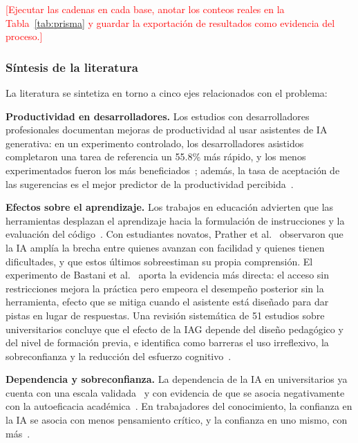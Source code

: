 \documentclass[12pt,letterpaper]{article}
\numberwithin{table}{section}
\numberwithin{figure}{section}
\newcommand{\pendiente}[1]{\textcolor{red}{[#1]}}
\begin{document}
\pendiente{Ejecutar las cadenas en cada base, anotar los conteos reales en la Tabla~\ref{tab:prisma} y guardar la exportación de resultados como evidencia del proceso.}

\subsubsection{Síntesis de la literatura}

La literatura se sintetiza en torno a cinco ejes relacionados con el problema:

\textbf{Productividad en desarrolladores.} Los estudios con desarrolladores profesionales documentan mejoras de productividad al usar asistentes de IA generativa: en un experimento controlado, los desarrolladores asistidos completaron una tarea de referencia un 55.8\% más rápido, y los menos experimentados fueron los más beneficiados~\cite{peng2023impact}; además, la tasa de aceptación de las sugerencias es el mejor predictor de la productividad percibida~\cite{ziegler2024measuring}.

\textbf{Efectos sobre el aprendizaje.} Los trabajos en educación advierten que las herramientas desplazan el aprendizaje hacia la formulación de instrucciones y la evaluación del código~\cite{becker2023programming}. Con estudiantes novatos, Prather et al.~\cite{prather2024widening} observaron que la IA amplía la brecha entre quienes avanzan con facilidad y quienes tienen dificultades, y que estos últimos sobreestiman su propia comprensión. El experimento de Bastani et al.~\cite{bastani2025generative} aporta la evidencia más directa: el acceso sin restricciones mejora la práctica pero empeora el desempeño posterior sin la herramienta, efecto que se mitiga cuando el asistente está diseñado para dar pistas en lugar de respuestas. Una revisión sistemática de 51 estudios sobre universitarios concluye que el efecto de la IAG depende del diseño pedagógico y del nivel de formación previa, e identifica como barreras el uso irreflexivo, la sobreconfianza y la reducción del esfuerzo cognitivo~\cite{martinezcarcelen2025impacto}.

\textbf{Dependencia y sobreconfianza.} La dependencia de la IA en universitarios ya cuenta con una escala validada~\cite{moralesgarcia2024development} y con evidencia de que se asocia negativamente con la autoeficacia académica~\cite{zhang2024dependency}. En trabajadores del conocimiento, la confianza en la IA se asocia con menos pensamiento crítico, y la confianza en uno mismo, con más~\cite{lee2025impact}.
\end{document}
